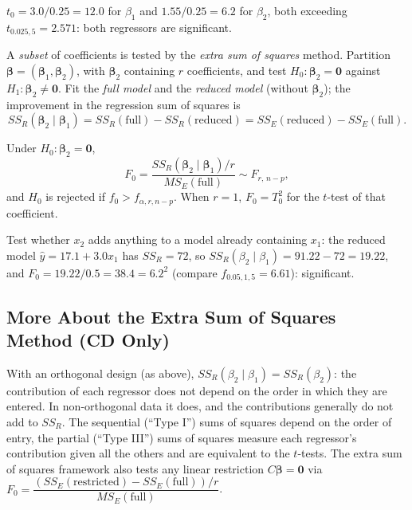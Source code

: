 \begin{example}
$t_0=3.0/0.25=12.0$ for $\beta_1$ and $1.55/0.25=6.2$ for $\beta_2$, both exceeding $t_{0.025,5}=2.571$: both regressors are significant.
\end{example}

A \emph{subset} of coefficients is tested by the \emph{extra sum of squares} method. Partition $\boldsymbol\beta=(\boldsymbol\beta_1,\boldsymbol\beta_2)$, with $\boldsymbol\beta_2$ containing $r$ coefficients, and test $H_0:\boldsymbol\beta_2=\mathbf{0}$ against $H_1:\boldsymbol\beta_2\ne\mathbf{0}$. Fit the \emph{full model} and the \emph{reduced model} (without $\boldsymbol\beta_2$); the improvement in the regression sum of squares is
\[ SS_R(\boldsymbol\beta_2\mid\boldsymbol\beta_1)=SS_R(\text{full})-SS_R(\text{reduced})=SS_E(\text{reduced})-SS_E(\text{full}). \]

\begin{theorem}\label{thm:partialF}
Under $H_0:\boldsymbol\beta_2=\mathbf{0}$,
\[ F_0=\frac{SS_R(\boldsymbol\beta_2\mid\boldsymbol\beta_1)/r}{MS_E(\text{full})}\sim F_{r,\,n-p}, \]
and $H_0$ is rejected if $f_0>f_{\alpha,r,n-p}$. When $r=1$, $F_0=T_0^2$ for the $t$-test of that coefficient.
\end{theorem}

\begin{example}
Test whether $x_2$ adds anything to a model already containing $x_1$: the reduced model $\hat{y}=17.1+3.0x_1$ has $SS_R=72$, so $SS_R(\beta_2\mid\beta_1)=91.22-72=19.22$, and $F_0=19.22/0.5=38.4=6.2^2$ (compare $f_{0.05,1,5}=6.61$): significant.
\end{example}

\subsection{More About the Extra Sum of Squares Method (CD Only)}

With an orthogonal design (as above), $SS_R(\beta_2\mid\beta_1)=SS_R(\beta_2)$: the contribution of each regressor does not depend on the order in which they are entered. In non-orthogonal data it does, and the contributions generally do not add to $SS_R$. The sequential (``Type I'') sums of squares depend on the order of entry, the partial (``Type III'') sums of squares measure each regressor's contribution given all the others and are equivalent to the $t$-tests. The extra sum of squares framework also tests any linear restriction $C\boldsymbol\beta=\mathbf{0}$ via $F_0=\dfrac{(SS_E(\text{restricted})-SS_E(\text{full}))/r}{MS_E(\text{full})}$.

